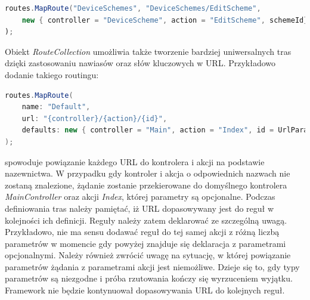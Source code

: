 \begin{lstlisting}[language=Java]
routes.MapRoute("DeviceSchemes", "DeviceSchemes/EditScheme", 
	new { controller = "DeviceScheme", action = "EditScheme", schemeId})
);
\end{lstlisting}
Obiekt \textit{RouteCollection} umożliwia także tworzenie bardziej uniwersalnych tras dzięki zastosowaniu nawiasów oraz słów kluczowych w URL. Przykładowo dodanie takiego routingu:
\begin{lstlisting}[language=Java]
routes.MapRoute(
    name: "Default",
    url: "{controller}/{action}/{id}",
    defaults: new { controller = "Main", action = "Index", id = UrlParameter.Optional }
);
\end{lstlisting}
spowoduje powiązanie każdego URL do kontrolera i akcji na podstawie nazewnictwa. W przypadku gdy kontroler i akcja o odpowiednich nazwach nie zostaną znalezione, żądanie zostanie przekierowane do domyślnego kontrolera \textit{MainController} oraz akcji \textit{Index}, której parametry są opcjonalne.
Podczas definiowania tras należy pamiętać, iż URL dopasowywany jest do reguł w kolejności ich definicji. Reguły należy zatem deklarować ze szczególną uwagą. Przykładowo, nie ma sensu dodawać reguł do tej samej akcji z różną liczbą parametrów w momencie gdy powyżej znajduje się deklaracja z parametrami opcjonalnymi. Należy również zwrócić uwagę na sytuację, w której powiązanie parametrów żądania z parametrami akcji jest niemożliwe. Dzieje się to, gdy typy parametrów są niezgodne i próba rzutowania kończy się wyrzuceniem wyjątku. Framework nie będzie kontynuował dopasowywania URL do kolejnych reguł.


